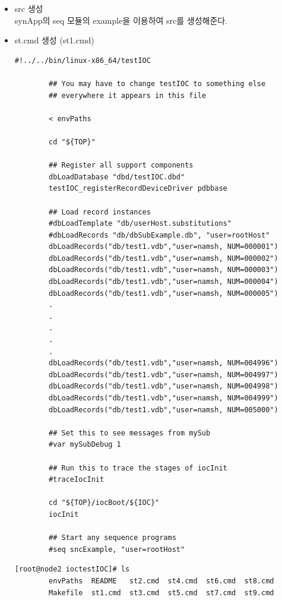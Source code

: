 \documentclass[11pt
  , a4paper
  , article
  , oneside
]{memoir}
\begin{document}
\begin{itemize}
\begin{lstlisting}[style=termstyle]
		#----------------------------------------------------
		#  Optimization of db files using dbst (DEFAULT: NO)
		#DB_OPT = YES
		
		#----------------------------------------------------
		# Create and install (or just install) into <top>/db
		# databases, templates, substitutions like this
		#DB += xxx.db
		DB += test1.vdb
		DB += test2.vdb
		DB += test3.vdb
		DB += test4.vdb
		DB += test5.vdb
		DB += test6.vdb
		DB += test7.vdb
		DB += test8.vdb
		DB += test9.vdb
		#----------------------------------------------------
		# If <anyname>.db template is not named <anyname>*.template add
		# <anyname>_template = <templatename>
		
		include $(TOP)/configure/RULES
		#----------------------------------------
		#  ADD RULES AFTER THIS LINE
		\end{lstlisting}
		\item src 생성\\
		synApp의 seq 모듈의 example을 이용하여 src를 생성해준다.
		\item st.cmd 생성 (st1.cmd)
		\begin{lstlisting}[style=termstyle]
		#!../../bin/linux-x86_64/testIOC
		
		## You may have to change testIOC to something else
		## everywhere it appears in this file
		
		< envPaths
		
		cd "${TOP}"
		
		## Register all support components
		dbLoadDatabase "dbd/testIOC.dbd"
		testIOC_registerRecordDeviceDriver pdbbase
		
		## Load record instances
		#dbLoadTemplate "db/userHost.substitutions"
		#dbLoadRecords "db/dbSubExample.db", "user=rootHost"
		dbLoadRecords("db/test1.vdb","user=namsh, NUM=000001")
		dbLoadRecords("db/test1.vdb","user=namsh, NUM=000002")
		dbLoadRecords("db/test1.vdb","user=namsh, NUM=000003")
		dbLoadRecords("db/test1.vdb","user=namsh, NUM=000004")
		dbLoadRecords("db/test1.vdb","user=namsh, NUM=000005")
		.
		.
		.
		.
		.
		dbLoadRecords("db/test1.vdb","user=namsh, NUM=004996")
		dbLoadRecords("db/test1.vdb","user=namsh, NUM=004997")
		dbLoadRecords("db/test1.vdb","user=namsh, NUM=004998")
		dbLoadRecords("db/test1.vdb","user=namsh, NUM=004999")
		dbLoadRecords("db/test1.vdb","user=namsh, NUM=005000")
		
		## Set this to see messages from mySub
		#var mySubDebug 1
		
		## Run this to trace the stages of iocInit
		#traceIocInit
		
		cd "${TOP}/iocBoot/${IOC}"
		iocInit
		
		## Start any sequence programs
		#seq sncExample, "user=rootHost"
		\end{lstlisting}
		\begin{lstlisting}[style=termstyle]
		[root@node2 ioctestIOC]# ls
		envPaths  README   st2.cmd  st4.cmd  st6.cmd  st8.cmd
		Makefile  st1.cmd  st3.cmd  st5.cmd  st7.cmd  st9.cmd
		\end{lstlisting}
		
	\end{itemize}
\end{document}
